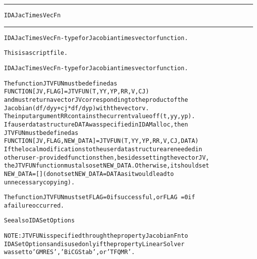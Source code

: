 \begin{samepage}
\hrule
\begin{center}
{\large \verb!IDAJacTimesVecFn!}
\label{p:IDAJacTimesVecFn}
\end{center}
\hrule\vspace{0.1in}



\begin{alltt}
IDAJacTimesVecFn - type for Jacobian times vector function.
\end{alltt}

\end{samepage}



\begin{samepage}


\begin{alltt}
This is a script file. 
\end{alltt}

\end{samepage}



\begin{alltt}
IDAJacTimesVecFn - type for Jacobian times vector function.

   The function JTVFUN must be defined as 
        FUNCTION [JV, FLAG] = JTVFUN(T,YY,YP,RR,V,CJ)
   and must return a vector JV corresponding to the product of the 
   Jacobian ( df/dyy + cj * df/dyp ) with the vector v.
   The input argument RR contains the current value of f(t,yy,yp).
   If a user data structure DATA was specified in IDAMalloc, then
   JTVFUN must be defined as
        FUNCTION [JV, FLAG, NEW_DATA] = JTVFUN(T,YY,YP,RR,V,CJ,DATA)
   If the local modifications to the user data structure are needed in
   other user-provided functions then, besides setting the vector JV,
   the JTVFUN function must also set NEW_DATA. Otherwise, it should set
   NEW_DATA=[] (do not set NEW_DATA = DATA as it would lead to
   unnecessary copying).

   The function JTVFUN must set FLAG=0 if successful, or FLAG~=0 if
   a failure occurred.

   See also IDASetOptions

   NOTE: JTVFUN is specified through the property JacobianFn to
   IDASetOptions and is used only if the property LinearSolver
   was set to 'GMRES', 'BiCGStab', or 'TFQMR'.
\end{alltt}






\vspace{0.1in}